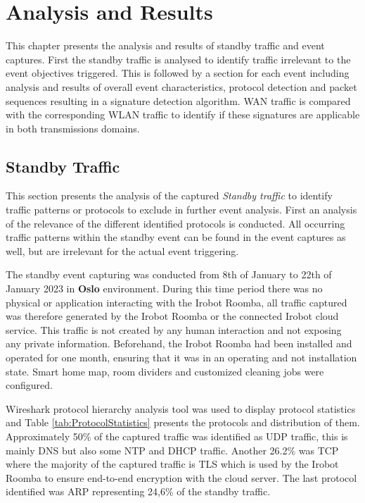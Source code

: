 \chapter{Analysis and Results}
\label{cap:AnalysisandResults}

This chapter presents the analysis and results of standby traffic and event captures. First the standby traffic is analysed to identify traffic irrelevant to the event objectives triggered. This is followed by a section for each event including analysis and results of overall event characteristics, protocol detection and packet sequences resulting in a signature detection algorithm. \gls{WAN} traffic is compared with the corresponding \gls{WLAN} traffic to identify if these signatures are applicable in both transmissions domains. 

\section{Standby Traffic}
This section presents the analysis of the captured \textit{Standby traffic} to identify traffic patterns or protocols to exclude in further event analysis. First an analysis of the relevance of the different identified protocols is conducted. All occurring traffic patterns within the standby event can be found in the event captures as well, but are irrelevant for the actual event triggering.

The standby event capturing was conducted from 8th of January to 22th of January 2023 in \textbf{Oslo} environment. During this time period there was no physical or application interacting with the Irobot Roomba, all traffic captured was therefore generated by the Irobot Roomba or the connected Irobot cloud service. This traffic is not created by any human interaction and not exposing any private information. Beforehand, the Irobot Roomba had been installed and operated for one month, ensuring that it was in an operating and not installation state. Smart home map, room dividers and customized cleaning jobs were configured. 

Wireshark protocol hierarchy analysis tool was used to display protocol statistics and Table \ref{tab:ProtocolStatistics} presents the protocols and distribution of them. Approximately 50\% of the captured traffic was identified as \gls{UDP} traffic, this is mainly \gls{DNS} but also some NTP and \gls{DHCP} traffic. Another 26.2\% was \gls{TCP} where the majority of the captured traffic is \gls{TLS} which is used by the Irobot Roomba to ensure end-to-end encryption with the cloud server. The last protocol identified was \gls{ARP} representing 24,6\% of the standby traffic. 


